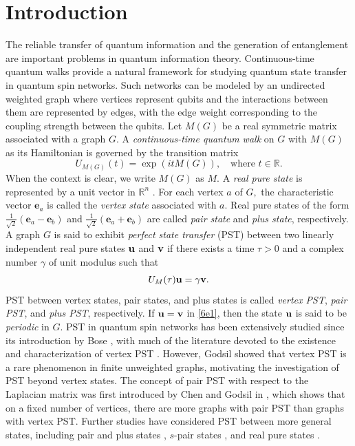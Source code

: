 \documentclass[12pt,a4paper]{article}
\def \e {{\bf e}}
\def \u {{\bf u}}
\def \v {{\bf v}}
\def \e {{\mathbf e}}
\newcommand{\ob}[1]{\left(#1\right)}
\begin{document}
\section{Introduction} 
The reliable transfer of quantum information and the generation of entanglement are important problems in quantum information theory. 
Continuous-time quantum walks provide a natural framework for studying quantum state transfer in quantum spin networks. Such networks can be modeled by an undirected weighted graph where vertices represent qubits and the interactions between them are represented by edges, with the edge weight corresponding to the coupling strength between the qubits. Let $M(G)$ be a real symmetric matrix associated with a graph $G.$ A \emph{continuous-time quantum walk} on $G$ with $M(G)$ as its Hamiltonian is governed by the transition matrix 
 \[U_{M(G)}(t)=\exp{(itM(G))},\quad \text{where $t\in\mathbb{R}.$} \] 
 When the context is clear, we write $M(G)$ as $M.$
A \emph{real pure state} is represented by a unit vector in $\mathbb{R}^n$ \cite{god7}. For each vertex $a$ of $G,$ the characteristic vector $\e_a$ is called the \emph{vertex state} associated with $a.$ Real pure states of the form $\frac{1}{\sqrt{2}}\ob{\e_a-\e_b}$ and $\frac{1}{\sqrt{2}}\ob{\e_a+\e_b}$ are called \emph{pair state} and \emph{plus state}, respectively. A graph $G$ is said to exhibit \emph{perfect state transfer} (PST) between two linearly independent real pure states $\u$ and $\v$ if there exists a time $\tau>0$ and a complex number $\gamma$ of unit modulus such that
\begin{equation}\label{6e1}
U_{M}(\tau)\u=\gamma\v.
\end{equation}
  PST between vertex states, pair states, and plus states is called \emph{vertex PST}, \emph{pair PST}, and \emph{plus PST}, respectively. If $\u=\v$ in \eqref{6e1}, then the state $\u$ is said to be \emph{periodic} in $G.$ 
PST in quantum spin networks has been extensively studied since its introduction by Bose \cite{bose}, with much of the literature devoted to the existence and characterization of vertex PST \cite{alv, bas1, pal9, cou7, god1, kirk3}.
However, Godsil \cite[Corollary 6.2]{god2} showed that vertex PST is a rare phenomenon in finite unweighted graphs,  motivating the investigation of PST beyond vertex states. The concept of pair PST  with respect to the Laplacian matrix was first introduced by Chen and Godsil in \cite{che1}, which shows that on a fixed number of vertices, there are more graphs with pair PST than graphs with vertex PST. Further studies have considered PST between more general states, including pair and plus states \cite{jia, ojha1, pal10, wang}, $s$-pair states \cite{kim}, and real pure states \cite{ god8, god7, pal11}.
\end{document}
